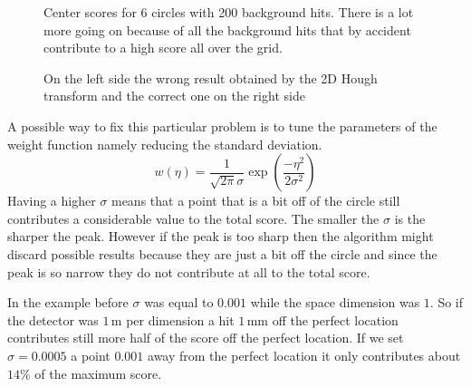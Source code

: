 \documentclass[11pt]{scrreprt}
\begin{document}
\begin{figure}
\centering

  \caption[Center scores for 6 circles with 200 background hits.]{Center scores for 6 circles with 200 background hits. There is a lot more going on because of all the background hits that by accident contribute to a high score all over the grid.}

\caption{On the left side the wrong result obtained by the 2D Hough transform and the correct one on the right side}
\end{figure}

A possible way to fix this particular problem is to tune the parameters of the weight function namely reducing the standard deviation. 
\[
  w(\eta) = \frac{1}{\sqrt{2\pi}\sigma}\exp\left( \frac{-\eta^2}{2\sigma^2}\right)
\]
Having a higher $\sigma$ means that a point that is a bit off of the circle still contributes a considerable value to the total score. 
The smaller the $\sigma$ is the sharper the peak. However if the peak is too sharp then the algorithm might discard possible results 
because they are just a bit off the circle and since the peak is so narrow they do not contribute at all to the total score.

In the example before $\sigma$ was equal to $0.001$ while the space dimension was $1$. So if the detector was $1$\,m per dimension a hit $1$\,mm off the perfect location contributes still more half of the score off the perfect location. If we set $\sigma=0.0005$ a point $0.001$ away from the perfect location it only contributes about $14\%$ of the maximum score.
\end{document}
